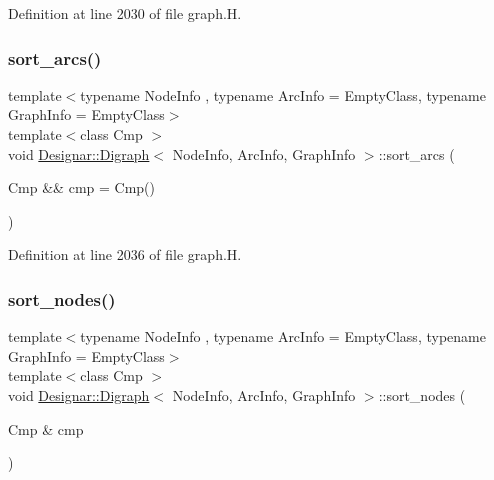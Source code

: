Definition at line 2030 of file graph.\+H.

\mbox{\label{class_designar_1_1_digraph_a44895030e02896d6d35277eec136c49f}} 
\subsubsection{\texorpdfstring{sort\+\_\+arcs()}{sort\_arcs()}\hspace{0.1cm}{\footnotesize\ttfamily [2/2]}}
{\footnotesize\ttfamily template$<$typename Node\+Info , typename Arc\+Info  = Empty\+Class, typename Graph\+Info  = Empty\+Class$>$ \\
template$<$class Cmp $>$ \\
void \hyperlink{class_designar_1_1_digraph}{Designar\+::\+Digraph}$<$ Node\+Info, Arc\+Info, Graph\+Info $>$\+::sort\+\_\+arcs (\begin{DoxyParamCaption}\item[{Cmp \&\&}]{cmp = {\ttfamily Cmp()} }\end{DoxyParamCaption})\hspace{0.3cm}{\ttfamily [inline]}}



Definition at line 2036 of file graph.\+H.

\mbox{\label{class_designar_1_1_digraph_a5d057854409452b7d4fb2f9eec217b7d}} 
\subsubsection{\texorpdfstring{sort\+\_\+nodes()}{sort\_nodes()}\hspace{0.1cm}{\footnotesize\ttfamily [1/2]}}
{\footnotesize\ttfamily template$<$typename Node\+Info , typename Arc\+Info  = Empty\+Class, typename Graph\+Info  = Empty\+Class$>$ \\
template$<$class Cmp $>$ \\
void \hyperlink{class_designar_1_1_digraph}{Designar\+::\+Digraph}$<$ Node\+Info, Arc\+Info, Graph\+Info $>$\+::sort\+\_\+nodes (\begin{DoxyParamCaption}\item[{Cmp \&}]{cmp }\end{DoxyParamCaption})\hspace{0.3cm}{\ttfamily [inline]}}



